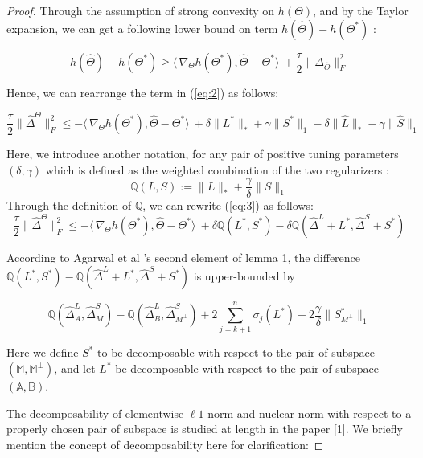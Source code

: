 \documentclass{article}
\begin{document}
\begin{proof}
Through the assumption of strong convexity on $h(\Theta)$, and by the Taylor expansion, we can get a following lower bound on term $h(\hat{\Theta})-h(\Theta^{*})$ :

\[
h(\hat{\Theta})-h(\Theta^{*}) \geq
\langle\, \nabla_{\Theta}h(\Theta^{*}),\hat{\Theta}-\Theta^{*}\rangle\
+ \frac{\tau}{2}\|\Delta_{\hat{\Theta}}\|_{F}^{2}
\]

Hence, we can rearrange the term in (\ref{eq:2}) as follows:

\begin{equation}\label{eq:3}
    \frac{\tau}{2}\|\hat{\Delta}^{\Theta}\|_{F}^{2} \leq
    -\langle\,\nabla_{\Theta}h(\Theta^{*}),\hat{\Theta}-\Theta^{*}\rangle\
    + \delta \|L^{*}\|_\ast + \gamma \|S^{*}\|_1
    - \delta \|\hat{L}\|_\ast - \gamma \|\hat{S}\|_1
\end{equation}

Here, we introduce another notation, for any pair of positive tuning parameters $(\delta,\gamma)$ which is defined as the weighted combination of the two regularizers :
\[
\mathbb{Q}(L,S)   := \|L\|_{*} + \frac{\gamma}{\delta}\|S\|_1
\]
Through the definition of $\mathbb{Q}$, we can rewrite (\ref{eq:3}) as follows:
\begin{equation}\label{eq:4}
    \frac{\tau}{2}\|\hat{\Delta}^{\Theta}\|_{F}^{2} \leq
    -\langle\,\nabla_{\Theta}h(\Theta^{*}),\hat{\Theta}-\Theta^{*}\rangle\
    + \delta \mathbb{Q}(L^{*},S^{*}) - \delta \mathbb{Q}(\hat{\Delta}^L + L^{*},\hat{\Delta}^S + S^{*})
\end{equation}

According to Agarwal et al \cite{agarwal2012noisy}'s second element of lemma 1,
the difference $\mathbb{Q}(L^*,S^*)- \mathbb{Q}(\hat{\Delta}^L + L^{*},\hat{\Delta}^S + S^{*})$ is upper-bounded by

\begin{equation}\label{eq:5}
    \mathbb{Q}(\hat{\Delta}^L_{A},\hat{\Delta}^S_{M}) - \mathbb{Q}(\hat{\Delta}^L_{B},\hat{\Delta}^S_{M^\perp})
    +2 \sum_{j=k+1}^{n} \sigma_{j}(L^*) + 2\frac{\gamma}{\delta}\|S^*_{M^\perp}\|_{1}
\end{equation}

Here we define $S^{*}$ to be decomposable with respect to the pair of subspace $(\mathbb{M},\mathbb{M}^{\perp})$, and let $L^{*}$ be decomposable with respect to the pair of subspace $(\mathbb{A},\mathbb{B})$.

The decomposability of elementwise $\ell 1$ norm and nuclear norm with respect to a properly chosen pair of subspace is studied at length in the paper [1]. We briefly mention the concept of decomposability here for clarification:


\end{proof}
\end{document}
